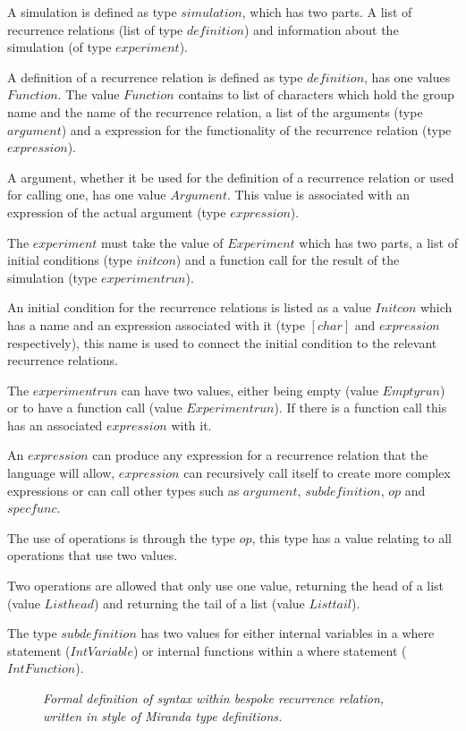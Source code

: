 \documentclass{article}
\begin{document}
A simulation is defined as type $simulation$, which has two parts. A list of recurrence relations (list of type $definition$) and information about the simulation (of type $experiment$). 

A definition of a recurrence relation is defined as type $definition$, has one values $Function$. The value $Function$ contains to list of characters which hold the group name and the name of the recurrence relation, a list of the arguments (type $argument$) and a expression for the functionality of the recurrence relation (type $expression$). 

A argument, whether it be used for the definition of a recurrence relation or used for calling one, has one value $Argument$. This value is associated with an expression of the actual argument (type $expression$). 

The $experiment$ must take the value of $Experiment$ which has two parts, a list of initial conditions (type $initcon$) and a function call for the result of the simulation (type $experimentrun$). 

An initial condition for the recurrence relations is listed as a value $Initcon$ which has a name and an expression associated with it (type $[char]$ and $expression$ respectively), this name is used to connect the initial condition to the relevant recurrence relations. 

The $experimentrun$ can have two values, either being empty (value $Emptyrun$) or to have a function call (value $Experimentrun$). If there is a function call this has an associated $expression$ with it. 

An $expression$ can produce any expression for a recurrence relation that the language will allow, $expression$ can recursively call itself to create more complex expressions or  can call other types such as $argument$, $subdefinition$, $op$ and $specfunc$.    

The use of operations is through the type $op$, this type has a value relating to all operations that use two values.

Two operations are allowed that only use one value, returning the head of a list (value $Listhead$) and returning the tail of a list (value $Listtail$). 

The type $subdefinition$ has two values for either internal variables in a where statement ($IntVariable$) or internal functions within a where statement ($IntFunction$).  

\begin{figure}[H]
	\centering
	
	\caption{\it Formal definition of syntax within bespoke recurrence relation, written in style of Miranda type definitions.}
	\label{fig:parsetreecode}
\end{figure} 
\end{document}
